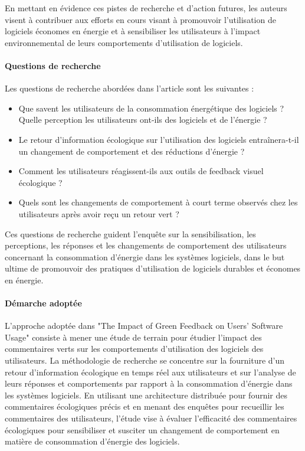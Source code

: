 En mettant en évidence ces pistes de recherche et d'action futures, les auteurs visent à contribuer aux efforts en cours visant à promouvoir l'utilisation de logiciels économes en énergie et à sensibiliser les utilisateurs à l'impact environnemental de leurs comportements d'utilisation de logiciels.

\paragraph{Questions de recherche}
Les questions de recherche abordées dans l'article sont les suivantes :

\begin{itemize}
    \item Que savent les utilisateurs de la consommation énergétique des logiciels ? Quelle perception les utilisateurs ont-ils des logiciels et de l’énergie ?
    \item Le retour d’information écologique sur l’utilisation des logiciels entraînera-t-il un changement de comportement et des réductions d’énergie ?
    \item Comment les utilisateurs réagissent-ils aux outils de feedback visuel écologique ?
    \item Quels sont les changements de comportement à court terme observés chez les utilisateurs après avoir reçu un retour vert ?
\end{itemize}

Ces questions de recherche guident l'enquête sur la sensibilisation, les perceptions, les réponses et les changements de comportement des utilisateurs concernant la consommation d'énergie dans les systèmes logiciels, dans le but ultime de promouvoir des pratiques d'utilisation de logiciels durables et économes en énergie.

\paragraph{Démarche adoptée}
L'approche adoptée dans "The Impact of Green Feedback on Users' Software Usage" consiste à mener une étude de terrain pour étudier l'impact des commentaires verts sur les comportements d'utilisation des logiciels des utilisateurs. La méthodologie de recherche se concentre sur la fourniture d'un retour d'information écologique en temps réel aux utilisateurs et sur l'analyse de leurs réponses et comportements par rapport à la consommation d'énergie dans les systèmes logiciels. En utilisant une architecture distribuée pour fournir des commentaires écologiques précis et en menant des enquêtes pour recueillir les commentaires des utilisateurs, l'étude vise à évaluer l'efficacité des commentaires écologiques pour sensibiliser et susciter un changement de comportement en matière de consommation d'énergie des logiciels.

